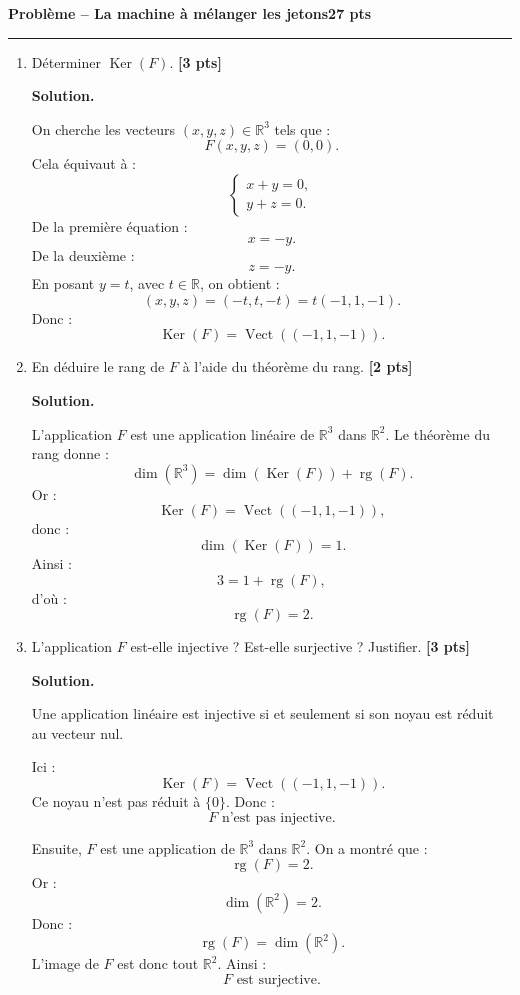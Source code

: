 \documentclass[11pt,a4paper]{article}
\newcommand{\pts}[1]{\hfill \textbf{[#1 pts]}}
\newcommand{\R}{\mathbb{R}}
\newcommand{\Ker}{\operatorname{Ker}}
\newcommand{\rg}{\operatorname{rg}}
\newcommand{\Vect}{\operatorname{Vect}}
\newcounter{probleme}
\newenvironment{probleme}[2]{
    \refstepcounter{probleme}
    \vspace{0.6cm}
    {\Large\color{bleu}\textbf{Problème \theprobleme{} -- #1}}\hfill \textbf{#2 pts}
    \par\medskip
    \hrule
    \medskip
}{\vspace{0.5cm}}
\newcommand{\solution}{
    \textbf{\color{bleu}Solution. }
}
\begin{document}
\begin{probleme}{La machine à mélanger les jetons}{27}
\begin{enumerate}[resume]
    \solution

    On a :
    \[
    F(x,y,z)=(x+y,y+z).
    \]
    Donc :
    \[
    F(e_1)=F(1,0,0)=(1,0),
    \]
    \[
    F(e_2)=F(0,1,0)=(1,1),
    \]
    \[
    F(e_3)=F(0,0,1)=(0,1).
    \]
    La matrice de \(F\) dans les bases canoniques est donc :
    \[
    \boxed{
    N=
    \begin{pmatrix}
    1&1&0\\
    0&1&1
    \end{pmatrix}.}
    \]

    \item Déterminer \(\Ker(F)\). \pts{3}

    \solution

    On cherche les vecteurs \((x,y,z)\in\R^3\) tels que :
    \[
    F(x,y,z)=(0,0).
    \]
    Cela équivaut à :
    \[
    \begin{cases}
    x+y=0,\\
    y+z=0.
    \end{cases}
    \]
    De la première équation :
    \[
    x=-y.
    \]
    De la deuxième :
    \[
    z=-y.
    \]
    En posant \(y=t\), avec \(t\in\R\), on obtient :
    \[
    (x,y,z)=(-t,t,-t)=t(-1,1,-1).
    \]
    Donc :
    \[
    \boxed{\Ker(F)=\Vect((-1,1,-1)).}
    \]

    \item En déduire le rang de \(F\) à l'aide du théorème du rang. \pts{2}

    \solution

    L'application \(F\) est une application linéaire de \(\R^3\) dans \(\R^2\). Le théorème du rang donne :
    \[
    \dim(\R^3)=\dim(\Ker(F))+\rg(F).
    \]
    Or :
    \[
    \Ker(F)=\Vect((-1,1,-1)),
    \]
    donc :
    \[
    \dim(\Ker(F))=1.
    \]
    Ainsi :
    \[
    3=1+\rg(F),
    \]
    d'où :
    \[
    \boxed{\rg(F)=2.}
    \]

    \item L'application \(F\) est-elle injective ? Est-elle surjective ? Justifier. \pts{3}

    \solution

    Une application linéaire est injective si et seulement si son noyau est réduit au vecteur nul.

    Ici :
    \[
    \Ker(F)=\Vect((-1,1,-1)).
    \]
    Ce noyau n'est pas réduit à \(\{0\}\). Donc :
    \[
    \boxed{F\text{ n'est pas injective}.}
    \]

    Ensuite, \(F\) est une application de \(\R^3\) dans \(\R^2\). On a montré que :
    \[
    \rg(F)=2.
    \]
    Or :
    \[
    \dim(\R^2)=2.
    \]
    Donc :
    \[
    \rg(F)=\dim(\R^2).
    \]
    L'image de \(F\) est donc tout \(\R^2\). Ainsi :
    \[
    \boxed{F\text{ est surjective}.}
    \]
\end{enumerate}


\end{probleme}
\end{document}

